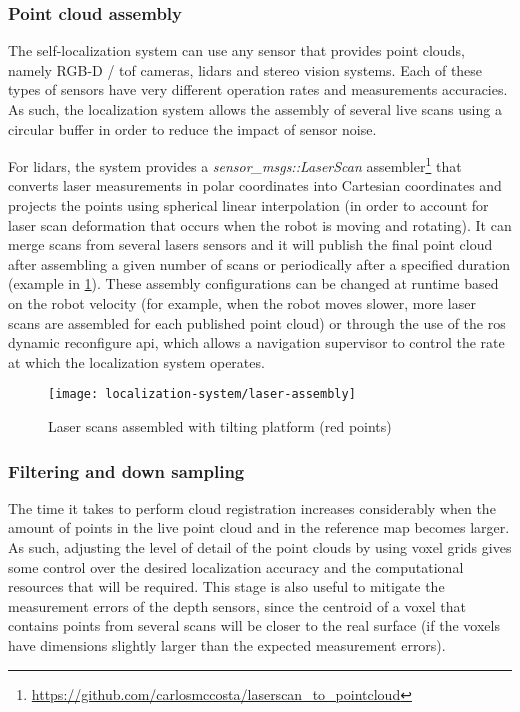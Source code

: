 \subsubsection{Point cloud assembly}

The self-localization system can use any sensor that provides point clouds, namely RGB-D / \gls{tof} cameras, \glspl{lidar} and stereo vision systems. Each of these types of sensors have very different operation rates and measurements accuracies. As such, the localization system allows the assembly of several live scans using a circular buffer in order to reduce the impact of sensor noise.

For \glspl{lidar}, the system provides a \emph{sensor\_msgs::LaserScan} assembler\footnote{\url{https://github.com/carlosmccosta/laserscan_to_pointcloud}} that converts laser measurements in polar coordinates into Cartesian coordinates and projects the points using spherical linear interpolation (in order to account for laser scan deformation that occurs when the robot is moving and rotating). It can merge scans from several lasers sensors and it will publish the final point cloud after assembling a given number of scans or periodically after a specified duration (example in \cref{fig:localization-system_section_laser_assembly}). These assembly configurations can be changed at runtime based on the robot velocity (for example, when the robot moves slower, more laser scans are assembled for each published point cloud) or through the use of the \gls{ros} dynamic reconfigure \gls{api}, which allows a navigation supervisor to control the rate at which the localization system operates.


\begin{figure}[H]
	\centering
	\texttt{[image: localization-system/laser-assembly]}
	\caption{Laser scans assembled with tilting platform (red points)}
	\label{fig:localization-system_section_laser_assembly}
\end{figure}


\subsubsection{Filtering and down sampling}

The time it takes to perform cloud registration increases considerably when the amount of points in the live point cloud and in the reference map becomes larger. As such, adjusting the level of detail of the point clouds by using voxel grids gives some control over the desired localization accuracy and the computational resources that will be required. This stage is also useful to mitigate the measurement errors of the depth sensors, since the centroid of a voxel that contains points from several scans will be closer to the real surface (if the voxels have dimensions slightly larger than the expected measurement errors).

